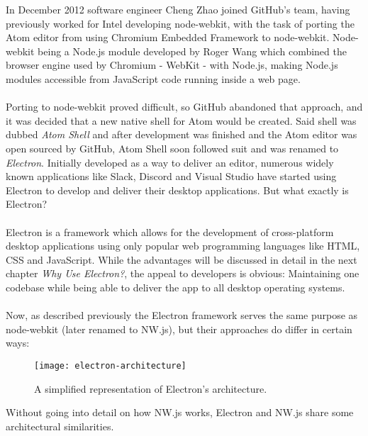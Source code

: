 In December 2012 software engineer Cheng Zhao joined GitHub's team, having previously worked for Intel developing
node-webkit, with the task of porting the Atom editor from using Chromium Embedded Framework to node-webkit.
Node-webkit being a Node.js module developed by Roger Wang which combined the browser engine used by Chromium - WebKit - 
with Node.js, making Node.js modules accessible from JavaScript code running inside a web page. \parencite{jensen2017}\paragraph{}

Porting to node-webkit proved difficult, so GitHub abandoned that approach, and it was decided that a new native shell
for Atom would be created.
Said shell was dubbed \emph{Atom Shell} and after development was finished and the Atom editor was open sourced
by GitHub, Atom Shell soon followed suit and was renamed to \emph{Electron}.
Initially developed as a way to deliver an editor, numerous widely known applications like Slack, Discord and Visual
Studio have started using Electron to develop and deliver their desktop applications.\parencite{electronDocs}
But what exactly is Electron?\paragraph{}
Electron is a framework which allows for the development of cross-platform desktop applications using only popular 
web programming languages like HTML, CSS and JavaScript. 
While the advantages will be discussed in detail in the next chapter \emph{Why Use Electron?}, the appeal to developers
is obvious: Maintaining one codebase while being able to deliver the app to all desktop operating systems.\paragraph{}
Now, as described previously the Electron framework serves the same purpose as node-webkit (later renamed to NW.js), but
their approaches do differ in certain ways: \parencite{jensen2017}\par
\begin{figure}[ht]
    \texttt{[image: electron-architecture]}
    \caption{A simplified representation of Electron's architecture. \parencite{jensen2017}}
    \label{fig:el-architecture}
\end{figure}
Without going into detail on how NW.js works, Electron and NW.js share some architectural similarities.
